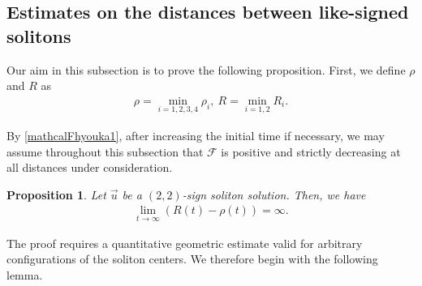 \documentclass[10pt,a4paper]{amsart}
\newtheorem{proposition}[theorem]{Proposition}
\numberwithin{equation}{section}
\begin{document}
\subsection{Estimates on the distances between like-signed solitons}

Our aim in this subsection is to prove the following proposition. First, we define $\rho$ and $R$ as 
\begin{align}\label{rhoRdef}
\rho=\min_{i=1,2,3,4}\rho_i,\ R=\min_{i=1,2}R_i.
\end{align}

By \eqref{mathcalFhyouka1}, after increasing the initial time if necessary, we may assume throughout this subsection that
$\mathcal{F}$ is positive and strictly decreasing at all distances under consideration.


\begin{proposition}\label{samesolitonhanare}
Let $\vec{u}$ be a $(2,2)$-sign soliton solution. Then, we have
\begin{align}\label{taikakusengomi}
\lim_{t\to\infty}\left(R(t)-\rho(t)\right)=\infty.
\end{align}
\end{proposition}

The proof requires a quantitative geometric estimate valid for arbitrary configurations of the soliton centers. We therefore begin with the following lemma.
\end{document}
